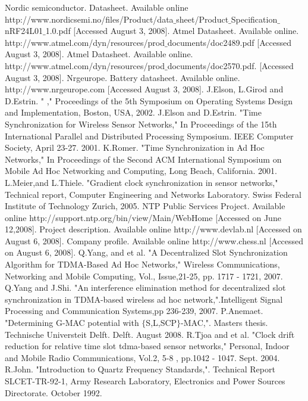 \documentclass[a4paper,10pt]{report}
\begin{document}
\begin{thebibliography}{\textbf{References}}
Nordic semiconductor. Datasheet. Available online http://www.nordicsemi.no/files/Product/data$\_$sheet/Product$\_$Specification$\_$nRF24L01$\_$1.0.pdf [Accessed August 3, 2008].
Atmel Datasheet. Available online.
 http://www.atmel.com/dyn/resources/prod$\_$documents/doc2489.pdf [Accessed August 3, 2008].
Atmel Datasheet. Available online.
 http://www.atmel.com/dyn/resources/prod$\_$documents/doc2570.pdf. [Accessed August 3, 2008].
Nrgeurope. Battery datasheet. Available online. http://www.nrgeurope.com [Accessed August 3, 2008].
J.Elson, L.Girod and D.Estrin. "
," Proceedings of the 5th Symposium on Operating Systems Design and Implementation, Boston, USA, 2002.
J.Elson and D.Estrin. "Time Synchronization for Wireless Sensor Networks," In Proceedings of the 15th International Parallel and Distributed Processing Symposium. IEEE Computer Society, April 23-27. 2001.
K.Romer. "Time Synchronization in Ad Hoc Networks," In Proceedings of the Second ACM International Symposium on Mobile Ad Hoc Networking and Computing, Long Beach, California. 2001.
L.Meier,and L.Thiele. "Gradient clock synchronization in sensor networks," Technical report, Computer Engineering and Networks Laboratory. Swiss Federal Institute of Technology Zurich, 2005.
NTP Public Services Project. Available online http://support.ntp.org/bin/view/Main/WebHome [Accessed on June 12,2008].
Project description. Available online http://www.devlab.nl [Accessed on August 6, 2008].
Company profile. Available online http://www.chess.nl [Accessed on August 6, 2008].
Q.Yang, and et al. "A Decentralized Slot Synchronization Algorithm for TDMA-Based Ad Hoc Networks," Wireless Communications, Networking and Mobile Computing, Vol., Issue,21-25, pp. 1717 - 1721, 2007.
Q.Yang and J.Shi. "An interference elimination method for decentralized slot synchronization in TDMA-based wireless ad hoc network,".Intelligent Signal Processing and Communication Systems,pp 236-239, 2007.
P.Anemaet. "Determining G-MAC potential with $\{$S,L,SCP$\}$-MAC,". Masters thesis. Technische Universteit Delft. Delft. August 2008.
R.Tjoa and et al. "Clock drift reduction for relative time slot tdma-based sensor networks," Personal, Indoor and Mobile Radio Communications, Vol.2, 5-8 , pp.1042 - 1047. Sept. 2004.
R.John. "Introduction to Quartz Frequency Standards,". Technical Report SLCET-TR-92-1, Army Research Laboratory, Electronics and Power Sources Directorate. October 1992.

\end{thebibliography}
\end{document}
